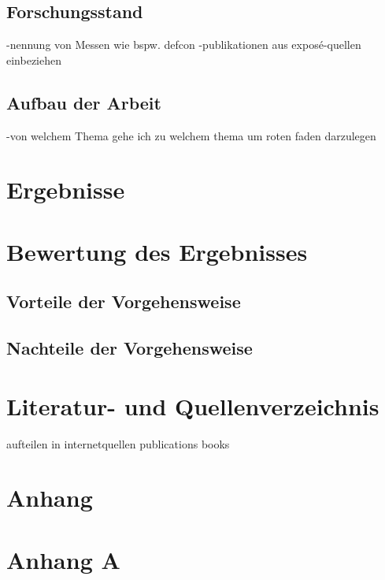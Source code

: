 \documentclass[12pt,oneside]{article}
\begin{document}
\subsection{Forschungsstand}
-nennung von Messen wie bspw. defcon
\newline
-publikationen aus exposé-quellen einbeziehen
\subsection{Aufbau der Arbeit}
-von welchem Thema gehe ich zu welchem thema um roten faden darzulegen








\newpage




\section{Ergebnisse}
\newpage

\section{Bewertung des Ergebnisses}
\subsection{Vorteile der Vorgehensweise}
\subsection{Nachteile der Vorgehensweise}
\newpage


\newpage 


\section{Literatur- und Quellenverzeichnis}

\printbibliography
{}
aufteilen in internetquellen
publications
books

\newpage
{}
\section{Anhang}
\appendix
\section{Anhang A} 





\clearpage

\end{document}
